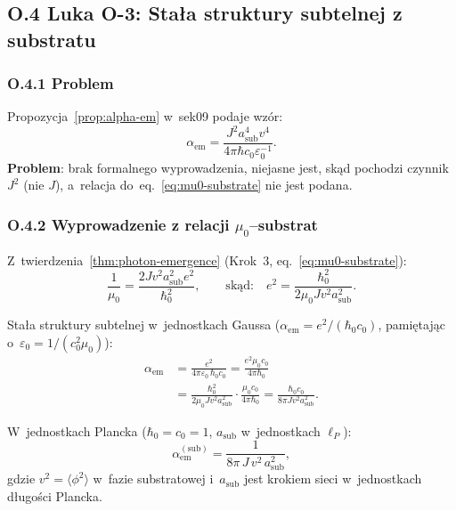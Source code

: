 \subsection*{O.4 Luka O-3: Stała struktury subtelnej z substratu}
\label{ssec:alpha_em_derivation}

\subsubsection*{O.4.1 Problem}

Propozycja~\ref{prop:alpha-em} w~sek09 podaje wzór:
\begin{equation}
  \alpha_\mathrm{em}
  = \frac{J^2 a_\mathrm{sub}^4 v^4}
         {4\pi\hbar c_0\varepsilon_0^{-1}}.
  \label{eq:alpha_sek09}
\end{equation}
\textbf{Problem}: brak formalnego wyprowadzenia, niejasne
jest, skąd pochodzi czynnik $J^2$ (nie $J$), a~relacja
do~eq.~\eqref{eq:mu0-substrate} nie jest podana.

\subsubsection*{O.4.2 Wyprowadzenie z relacji $\mu_0$--substrat}

Z~twierdzenia~\ref{thm:photon-emergence} (Krok~3, eq.~\eqref{eq:mu0-substrate}):
\begin{equation}
  \frac{1}{\mu_0} = \frac{2Jv^2 a_\mathrm{sub}^2 e^2}{\hbar_0^2},
  \qquad \text{skąd:} \quad
  e^2 = \frac{\hbar_0^2}{2\mu_0 J v^2 a_\mathrm{sub}^2}.
  \label{eq:e2_from_mu0}
\end{equation}

Stała struktury subtelnej w~jednostkach Gaussa ($\alpha_\mathrm{em} = e^2/(\hbar_0 c_0)$,
pamiętając o~$\varepsilon_0 = 1/(c_0^2\mu_0)$):
\begin{align}
  \alpha_\mathrm{em}
  &= \frac{e^2}{4\pi\varepsilon_0\,\hbar_0 c_0}
  = \frac{e^2 \mu_0 c_0}{4\pi\hbar_0}
  \label{eq:alpha_def_SI}\\
  &= \frac{\hbar_0^2}{2\mu_0 J v^2 a_\mathrm{sub}^2}
     \cdot \frac{\mu_0 c_0}{4\pi\hbar_0}
  = \frac{\hbar_0 c_0}{8\pi J v^2 a_\mathrm{sub}^2}.
  \label{eq:alpha_derived}
\end{align}

\begin{propozycja}
\label{prop:alpha_em_formal}
W~jednostkach Plancka ($\hbar_0 = c_0 = 1$, $a_\mathrm{sub}$ w~jednostkach $\ell_P$):
\begin{equation}
  \boxed{
    \alpha_\mathrm{em}^\mathrm{(sub)}
    = \frac{1}{8\pi\, J\, v^2\, a_\mathrm{sub}^2},
  }
  \label{eq:alpha_formal}
\end{equation}
gdzie $v^2 = \langle\phi^2\rangle$ w~fazie substratowej i~$a_\mathrm{sub}$
jest krokiem sieci w~jednostkach długości Plancka.
\end{propozycja}

